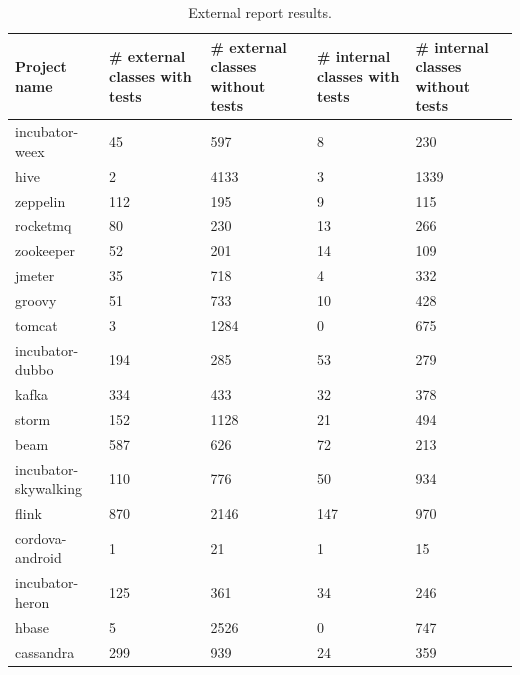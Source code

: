 \documentclass[11pt, a4paper, twocolumn]{article}
\begin{document}
\begin{table}[] \centering
\begin{tabular}{ | m{7em} | C{7em} | C{7em} | C{7em} | C{7em} |}
\hline \textbf{Project name } & \textbf{\# external classes with tests} & \textbf{\# external classes without tests} & \textbf{\# internal classes with tests} & \textbf{\# internal classes without tests}  \\
\hline incubator-weex       & 45		& 597       & 8		& 230 	\\
\hline hive                 & 2		& 4133		& 3    	& 1339 	\\
\hline zeppelin             & 112	& 195       & 9		& 115  	\\
\hline rocketmq             & 80		& 230      	& 13		& 266  	\\
\hline zookeeper            & 52		& 201      	& 14   	& 109  	\\
\hline jmeter               & 35		& 718		& 4     & 332  	\\
\hline groovy               & 51		& 733       & 10		& 428  	\\
\hline tomcat               & 3		& 1284     	& 0     & 675  	\\
\hline incubator-dubbo      & 194	& 285  		& 53		& 279	\\
\hline kafka                & 334	& 433		& 32    	& 378	\\
\hline storm                & 152	& 1128		& 21    & 494	\\
\hline beam                 & 587	& 626		& 72		& 213	\\
\hline incubator-skywalking & 110	& 776		& 50    & 934	\\
\hline flink                & 870	& 2146		& 147	& 970	\\
\hline cordova-android      & 1		& 21			& 1     & 15		\\
\hline incubator-heron      & 125 	& 361		& 34		& 246	\\
\hline hbase                & 5    	& 2526		& 0     & 747  	\\
\hline cassandra            & 299   	& 939		& 24		& 359 	\\
\hline 
\end{tabular}
\caption{External report results.}
\label{table:report}
\end{table}
\end{document}
